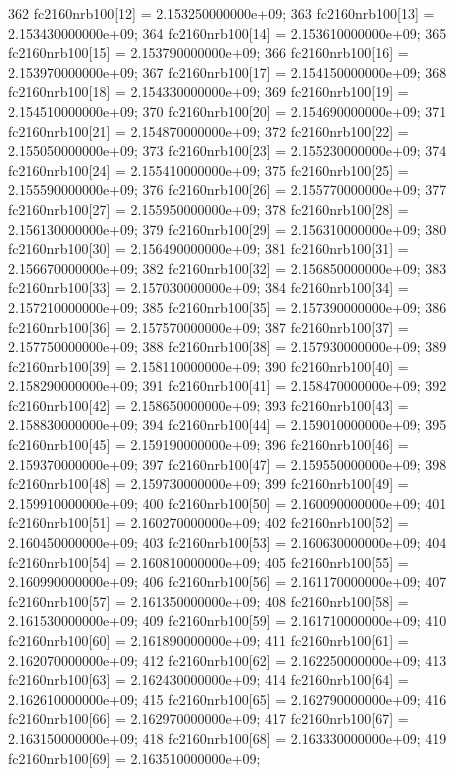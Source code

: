 \begin{DoxyCode}
362   fc2160nrb100[12] = 2.153250000000e+09;
363   fc2160nrb100[13] = 2.153430000000e+09;
364   fc2160nrb100[14] = 2.153610000000e+09;
365   fc2160nrb100[15] = 2.153790000000e+09;
366   fc2160nrb100[16] = 2.153970000000e+09;
367   fc2160nrb100[17] = 2.154150000000e+09;
368   fc2160nrb100[18] = 2.154330000000e+09;
369   fc2160nrb100[19] = 2.154510000000e+09;
370   fc2160nrb100[20] = 2.154690000000e+09;
371   fc2160nrb100[21] = 2.154870000000e+09;
372   fc2160nrb100[22] = 2.155050000000e+09;
373   fc2160nrb100[23] = 2.155230000000e+09;
374   fc2160nrb100[24] = 2.155410000000e+09;
375   fc2160nrb100[25] = 2.155590000000e+09;
376   fc2160nrb100[26] = 2.155770000000e+09;
377   fc2160nrb100[27] = 2.155950000000e+09;
378   fc2160nrb100[28] = 2.156130000000e+09;
379   fc2160nrb100[29] = 2.156310000000e+09;
380   fc2160nrb100[30] = 2.156490000000e+09;
381   fc2160nrb100[31] = 2.156670000000e+09;
382   fc2160nrb100[32] = 2.156850000000e+09;
383   fc2160nrb100[33] = 2.157030000000e+09;
384   fc2160nrb100[34] = 2.157210000000e+09;
385   fc2160nrb100[35] = 2.157390000000e+09;
386   fc2160nrb100[36] = 2.157570000000e+09;
387   fc2160nrb100[37] = 2.157750000000e+09;
388   fc2160nrb100[38] = 2.157930000000e+09;
389   fc2160nrb100[39] = 2.158110000000e+09;
390   fc2160nrb100[40] = 2.158290000000e+09;
391   fc2160nrb100[41] = 2.158470000000e+09;
392   fc2160nrb100[42] = 2.158650000000e+09;
393   fc2160nrb100[43] = 2.158830000000e+09;
394   fc2160nrb100[44] = 2.159010000000e+09;
395   fc2160nrb100[45] = 2.159190000000e+09;
396   fc2160nrb100[46] = 2.159370000000e+09;
397   fc2160nrb100[47] = 2.159550000000e+09;
398   fc2160nrb100[48] = 2.159730000000e+09;
399   fc2160nrb100[49] = 2.159910000000e+09;
400   fc2160nrb100[50] = 2.160090000000e+09;
401   fc2160nrb100[51] = 2.160270000000e+09;
402   fc2160nrb100[52] = 2.160450000000e+09;
403   fc2160nrb100[53] = 2.160630000000e+09;
404   fc2160nrb100[54] = 2.160810000000e+09;
405   fc2160nrb100[55] = 2.160990000000e+09;
406   fc2160nrb100[56] = 2.161170000000e+09;
407   fc2160nrb100[57] = 2.161350000000e+09;
408   fc2160nrb100[58] = 2.161530000000e+09;
409   fc2160nrb100[59] = 2.161710000000e+09;
410   fc2160nrb100[60] = 2.161890000000e+09;
411   fc2160nrb100[61] = 2.162070000000e+09;
412   fc2160nrb100[62] = 2.162250000000e+09;
413   fc2160nrb100[63] = 2.162430000000e+09;
414   fc2160nrb100[64] = 2.162610000000e+09;
415   fc2160nrb100[65] = 2.162790000000e+09;
416   fc2160nrb100[66] = 2.162970000000e+09;
417   fc2160nrb100[67] = 2.163150000000e+09;
418   fc2160nrb100[68] = 2.163330000000e+09;
419   fc2160nrb100[69] = 2.163510000000e+09;

\end{DoxyCode}
